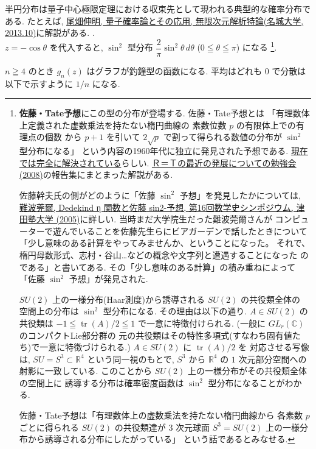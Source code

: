 \documentclass[12pt,twoside]{jarticle}
\newcommand\R{{\mathbb R}} %
\newcommand\C{{\mathbb C}} %
\theoremstyle{jplain}
\theoremstyle{jplain}
\theoremstyle{jplain}
\numberwithin{theorem}{section}
\numberwithin{equation}{section}
\numberwithin{figure}{section}
\numberwithin{table}{section}
\begin{document}
\begin{itemize}
{半円分布は量子中心極限定理における収束先として現われる典型的な確率分布である.
たとえば, 
\href{http://www.math.is.tohoku.ac.jp/~obata/student/graduate/file/2013-Meijo-QP-Graph.pdf}
{尾畑伸明, 量子確率論とその応用, 無限次元解析特論(名城大学, 2013.10)}に解説がある.
}.
\\
$z=-\cos\theta$ を代入すると, $\sin^2$ 型分布 
$\dfrac{2}{\pi}\sin^2\theta\,d\theta$ ($0\leqq\theta\leqq\pi$) になる%
\footnote{\label{fn:Sato-Tate}%
{\bf 佐藤・Tate予想}にこの型の分布が登場する.
佐藤・Tate予想とは
「有理数体上定義された虚数乗法を持たない楕円曲線の
素数位数 $p$ の有限体上での有理点の個数
から $p+1$ を引いて $2\sqrt{p}$ で割って得られる数値の分布が $\sin^2$ 型分布になる」
という内容の1960年代に独立に発見された予想である.
\href{http://www.math.ias.edu/~rtaylor/}{現在では完全に解決されている}らしい.
\href{http://www.kurims.kyoto-u.ac.jp/~gokun/R=T.html}
{Ｒ＝Ｔの最近の発展についての勉強会(2008)}の報告集にまとまった解説がある.

佐藤幹夫氏の側がどのように「佐藤 $\sin^2$ 予想」を発見したかについては, 
\href{http://www2.tsuda.ac.jp/suukeiken/math/suugakushi/sympo16/16_8nanba.pdf}
{難波莞爾, Dedekind η 関数と佐藤 sin2-予想, 第16回数学史シンポジウム, 
津田塾大学 (2005)}に詳しい. 当時まだ大学院生だった難波莞爾さんが
コンピューターで遊んでいることを佐藤先生らにビアガーデンで話したときについて
「少し意味のある計算をやってみませんか、ということになった。
それで、楕円母数形式、志村・谷山…などの概念や文字列と遭遇することになった
のである」と書いてある. その「少し意味のある計算」の積み重ねによって
「佐藤 $\sin^2$ 予想」が発見された.

$SU(2)$ 上の一様分布(Haar測度)から誘導される $SU(2)$ の共役類全体の
空間上の分布は $\sin^2$ 型分布になる. その理由は以下の通り.
$A\in SU(2)$ の共役類は $-1\leqq\operatorname{tr}(A)/2\leqq 1$
で一意に特徴付けられる. (一般に $GL_r(\C)$ のコンパクトLie部分群の
元の共役類はその特性多項式(すなわち固有値たち)で一意に特徴づけられる.)
$A\in SU(2)$ に $\operatorname{tr}(A)/2$ を
対応させる写像は, $SU=S^3\subset\R^4$ という同一視のもとで, 
$S^3$ から $\R^4$ の $1$ 次元部分空間への射影に一致している.
このことから $SU(2)$ 上の一様分布がその共役類全体の空間上に
誘導する分布は確率密度函数は $\sin^2$ 型分布になることがわかる.

佐藤・Tate予想は「有理数体上の虚数乗法を持たない楕円曲線から
各素数 $p$ ごとに得られる $SU(2)$ の共役類達が 
$3$ 次元球面 $S^3=SU(2)$ 上の一様分布から誘導される分布にしたがっている」
という話であるとみなせる.
}.

\end{itemize}
$n\geqq 4$ のとき $g_n(z)$ はグラフが釣鐘型の函数になる.
平均はどれも $0$ で分散は以下で示すように $1/n$ になる.
\end{document}
